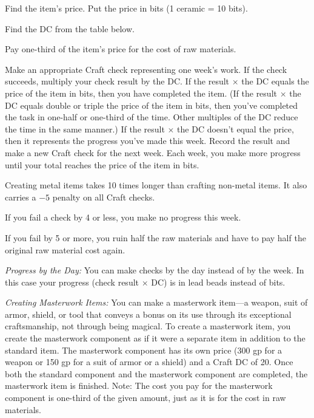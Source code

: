 \begin{enumerate*}
\item Find the item's price. Put the price in bits (1 ceramic = 10 bits).
\item Find the DC from the table below.
\item Pay one-third of the item's price for the cost of raw materials.
\item Make an appropriate Craft check representing one week's work. If the check succeeds, multiply your check result by the DC. If the result $\times$ the DC equals the price of the item in bits, then you have completed the item. (If the result $\times$ the DC equals double or triple the price of the item in bits, then you've completed the task in one-half or one-third of the time. Other multiples of the DC reduce the time in the same manner.) If the result $\times$ the DC doesn't equal the price, then it represents the progress you've made this week. Record the result and make a new Craft check for the next week. Each week, you make more progress until your total reaches the price of the item in bits.
\end{enumerate*}

Creating metal items takes 10 times longer than crafting non-metal items. It also carries a $-5$ penalty on all Craft checks.

If you fail a check by 4 or less, you make no progress this week.

If you fail by 5 or more, you ruin half the raw materials and have to pay half the original raw material cost again.

\textit{Progress by the Day:} You can make checks by the day instead of by the week. In this case your progress (check result $\times$ DC) is in lead beads instead of bits.

\textit{Creating Masterwork Items:} You can make a masterwork item---a weapon, suit of armor, shield, or tool that conveys a bonus on its use through its exceptional craftsmanship, not through being magical. To create a masterwork item, you create the masterwork component as if it were a separate item in addition to the standard item. The masterwork component has its own price (300 gp for a weapon or 150 gp for a suit of armor or a shield) and a Craft DC of 20. Once both the standard component and the masterwork component are completed, the masterwork item is finished. Note: The cost you pay for the masterwork component is one-third of the given amount, just as it is for the cost in raw materials.

